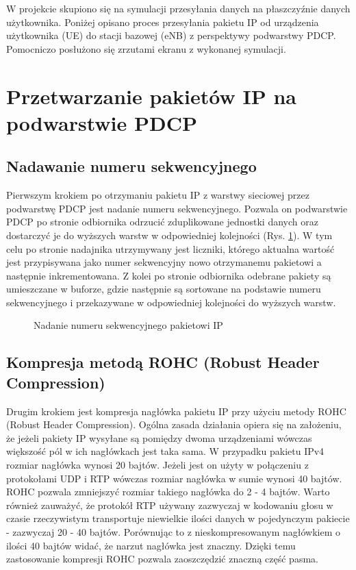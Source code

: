 W projekcie skupiono się na symulacji przesyłania danych na płaszczyźnie danych użytkownika. Poniżej opisano proces przesyłania pakietu IP od urządzenia użytkownika (UE) do stacji bazowej (eNB) z perspektywy podwarstwy PDCP. Pomocniczo posłużono się zrzutami ekranu z wykonanej symulacji.

\section{Przetwarzanie pakietów IP na podwarstwie PDCP}

\subsection{Nadawanie numeru sekwencyjnego}

Pierwszym krokiem po otrzymaniu pakietu IP z warstwy sieciowej przez podwarstwę PDCP jest nadanie numeru sekwencyjnego. Pozwala on podwarstwie PDCP po stronie odbiornika odrzucić zduplikowane jednostki danych oraz dostarczyć je do wyższych warstw w odpowiedniej kolejności (Rys. \ref{fig:pdcpseq}). 
W tym celu po stronie nadajnika utrzymywany jest liczniki, którego aktualna wartość jest przypisywana jako numer sekwencyjny nowo otrzymanemu pakietowi a następnie inkrementowana. Z kolei po stronie odbiornika odebrane pakiety są umieszczane w buforze, gdzie następnie są sortowane na podstawie numeru sekwencyjnego i przekazywane w odpowiedniej kolejności do wyższych warstw.

\begin{figure}[ht]
	\centerline{}
	\caption{Nadanie numeru sekwencyjnego pakietowi IP}
	\label{fig:pdcpseq}
\end{figure}

\subsection{Kompresja metodą ROHC (Robust Header Compression)}

Drugim krokiem jest kompresja nagłówka pakietu IP przy użyciu metody ROHC (Robust Header Compression). Ogólna zasada działania opiera się na założeniu, że jeżeli pakiety IP wysyłane są pomiędzy dwoma urządzeniami wówczas większość pól w ich nagłówkach jest taka sama. W przypadku pakietu IPv4 rozmiar nagłówka wynosi 20 bajtów. Jeżeli jest on użyty w połączeniu z protokołami UDP i RTP wówczas rozmiar nagłówka w sumie wynosi 40 bajtów. ROHC pozwala zmniejszyć rozmiar takiego nagłówka do 2 - 4 bajtów. Warto również zauważyć, że protokół RTP używany zazwyczaj w kodowaniu głosu w czasie rzeczywistym transportuje niewielkie ilości danych w pojedynczym pakiecie - zazwyczaj 20 - 40 bajtów. Porównując to z nieskompresowanym nagłówkiem o ilości 40 bajtów widać, że narzut nagłówka jest znaczny. Dzięki temu zastosowanie kompresji ROHC pozwala zaoszczędzić znaczną część pasma.

